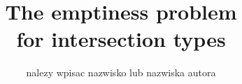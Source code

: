 
\def\tr{{\small \sl TR 94-04(193)}} %
\pagestyle{myheadings}

\title{The emptiness problem \\ for intersection types} 
\author{nalezy wpisac nazwisko lub nazwiska autora} 
\date{}


\thispagestyle{empty}
\tableofcontents
\vfill\eject

\maketitle
\setcounter{page}{1}





